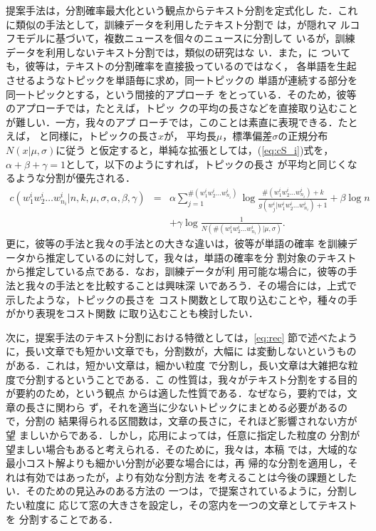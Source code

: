 提案手法は，分割確率最大化という観点からテキスト分割を定式化し
た．これに類似の手法として，訓練データを利用したテキスト分割で
は，\cite{mulbregt98:_hidden_markov_model_approac_text}が隠れマ
ルコフモデルに基づいて，複数ニュースを個々のニュースに分割して
いるが，訓練データを利用しないテキスト分割では，類似の研究はな
い．また，\cite{mulbregt98:_hidden_markov_model_approac_text}に
ついても，彼等は，テキストの分割確率を直接扱っているのではなく，
各単語を生起させるようなトピックを単語毎に求め，同一トピックの
単語が連続する部分を同一トピックとする，という間接的アプローチ
をとっている．そのため，彼等のアプローチでは，たとえば，トピッ
クの平均の長さなどを直接取り込むことが難しい．一方，我々のアプ
ローチでは，このことは素直に表現できる．たとえば，
\cite{ponte97:_text_segmen_topic}と同様に，トピックの長さ$x$が，
平均長$\mu$，標準偏差$\sigma$の正規分布$N(x|\mu,\sigma)$に従う
と仮定すると，単純な拡張としては，(\ref{eq:cS_i})式を，$\alpha
+ \beta + \gamma = 1$として，以下のようにすれば，トピックの長さ
が平均と同じくなるような分割が優先される．
\begin{eqnarray}
  c(w^i_1 w^i_2 \ldots w^i_{n_i}|n,k,\mu,\sigma,\alpha,\beta,\gamma)& = &\alpha \sum_{j=1}^{\#(w^i_1 w^i_2 \ldots w^i_{n_i})} \log \frac{\#(w^i_1 w^i_2 \ldots w^i_{n_i})+k}{g(w^i_j|w^i_1 w^i_2 \ldots w^i_{n_i})+1} + \beta \log n \nonumber \\
  & & + \gamma \log \frac{1}{N(\#(w^i_1 w^i_2 \ldots w^i_{n_i})|\mu,\sigma)}. \nonumber
\end{eqnarray} 
更に，彼等の手法と我々の手法との大きな違いは，彼等が単語の確率
を訓練データから推定しているのに対して，我々は，単語の確率を分
割対象のテキストから推定している点である．なお，訓練データが利
用可能な場合に，彼等の手法と我々の手法とを比較することは興味深
いであろう．その場合には，上式で示したような，トピックの長さを
コスト関数として取り込むことや，種々の手がかり表現をコスト関数
に取り込むことも検討したい．

次に，提案手法のテキスト分割における特徴としては，\ref{eq:rec}
節で述べたように，長い文章でも短かい文章でも，分割数が，大幅に
は変動しないというものがある．これは，短かい文章は，細かい粒度
で分割し，長い文章は大雑把な粒度で分割するということである．こ
の性質は，我々がテキスト分割をする目的が要約のため，という観点
からは適した性質である．なぜなら，要約では，文章の長さに関わら
ず，それを適当に少ないトピックにまとめる必要があるので，分割の
結果得られる区間数は，文章の長さに，それほど影響されない方が望
ましいからである．しかし，応用によっては，任意に指定した粒度の
分割が望ましい場合もあると考えられる．そのために，我々は，本稿
では，大域的な最小コスト解よりも細かい分割が必要な場合には，再
帰的な分割を適用し，それは有効ではあったが，より有効な分割方法
を考えることは今後の課題としたい．そのための見込みのある方法の
一つは，\cite{nakao99}で提案されているように，分割したい粒度に
応じて窓の大きさを設定し，その窓内を一つの文章としてテキストを
分割することである．


